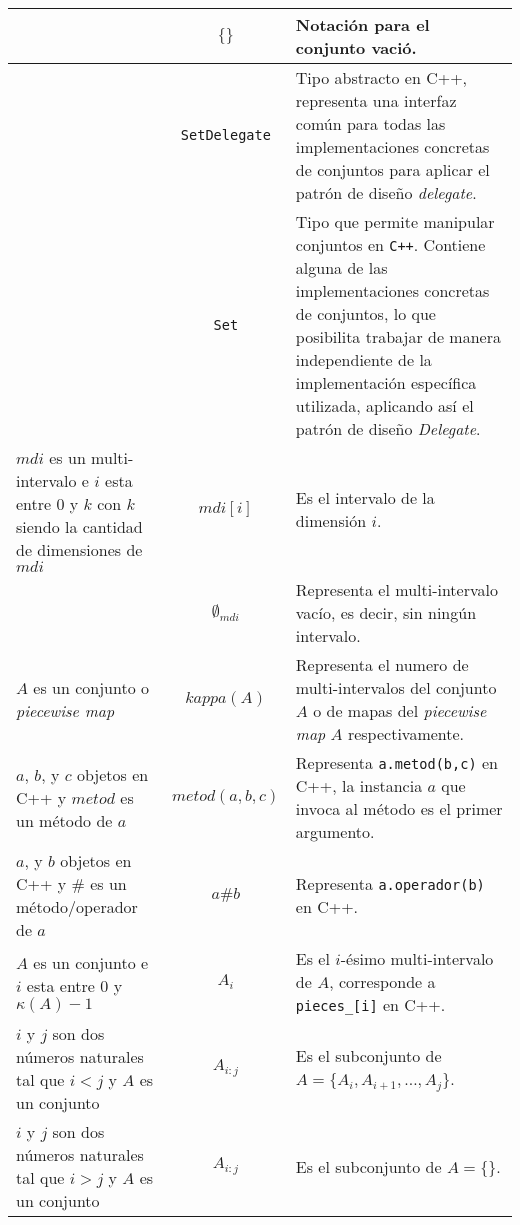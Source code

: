 \begin{table}[h]
{\begin{tabular}{|p{8cm}|c|p{12cm}|}
& $\{\}$ & Notación para el conjunto vació. \\ \hline

 & \texttt{SetDelegate} & Tipo abstracto en C++, representa una interfaz común para todas las implementaciones concretas de conjuntos para aplicar el patrón de diseño \textit{delegate}. \\ \hline

  & \texttt{Set} & Tipo que permite manipular conjuntos en \texttt{C++}. 
Contiene alguna de las implementaciones concretas de conjuntos, lo que posibilita trabajar de manera independiente de la implementación específica utilizada, aplicando así el patrón de diseño \textit{Delegate}.
 \\ \hline

$mdi$ es un multi-intervalo e $i$ esta entre 0 y $k$ con $k$ siendo la cantidad de dimensiones de $mdi$& $mdi[i]$ & Es el intervalo de la dimensión $i$. \\ \hline

 & $\emptyset_{mdi}$& Representa el multi-intervalo vacío, es decir, sin ningún intervalo. \\ \hline

$A$ es un conjunto o \textit{piecewise map} & $kappa(A)$& Representa el numero de multi-intervalos del conjunto $A$ o de mapas del \textit{piecewise map} $A$ respectivamente. \\ \hline

$a$, $b$, y $c$ objetos en C++ y $metod$ es un método de $a$ & $metod(a,b,c)$ & Representa \texttt{a.metod(b,c)} en C++, la instancia $a$ que invoca al método es el primer argumento. \\ \hline

$a$, y $b$ objetos en C++ y $\#$ es un método/operador de $a$ & $a \# b$ & Representa \texttt{a.operador(b)} en C++. \\ \hline

$A$ es un conjunto e $i$ esta entre 0 y $\kappa(A)-1$&  $A_i$& Es el $i$-ésimo multi-intervalo de $A$, corresponde a \texttt{pieces\_[i]} en C++.\\ \hline

$i$ y $j$ son dos números naturales tal que $i < j$ y $A$ es un conjunto& $A_{i:j}$ & Es el subconjunto de $A = \{A_i, A_{i+1},\dots,A_{j}\}$. \\ \hline

$i$ y $j$ son dos números naturales tal que $i > j$ y $A$ es un conjunto & $A_{i:j}$ & Es el subconjunto de $A = \{\}$. \\ \hline


\end{tabular}}
\end{table}
